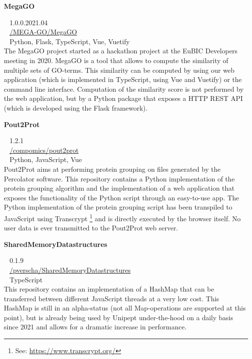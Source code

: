 \begin{large}\textbf{\textsf{MegaGO}}\end{large} \hfill \faTag ~ \textsf{1.0.0.2021.04} \\
\faGithub ~ \href{https://github.com/MEGA-GO/MegaGO}{\textsf{/MEGA-GO/MegaGO}} \\
\faCode ~ \textsf{Python, Flask, TypeScript, Vue, Vuetify} \\
The MegaGO project started as a hackathon project at the EuBIC Developers meeting in 2020.
MegaGO is a tool that allows to compute the similarity of multiple sets of GO-terms.
This similarity can be computed by using our web application (which is implemented in TypeScript, using Vue and Vuetify) or the command line interface.
Computation of the similarity score is not performed by the web application, but by a Python package that exposes a HTTP REST API (which is developed using the Flask framework).

\begin{large}\textbf{\textsf{Pout2Prot}}\end{large} \hfill \faTag ~ \textsf{1.2.1} \\
\faGithub ~ \href{https://github.com/compomics/pout2prot}{\textsf{/compomics/pout2prot}} \\
\faCode ~ \textsf{Python, JavaScript, Vue} \\
Pout2Prot aims at performing protein grouping on files generated by the Percolator software.
This repository contains a Python implementation of the protein grouping algorithm and the implementation of a web application that exposes the functionality of the Python script through an easy-to-use app.
The Python implementation of the protein grouping script has been transpiled to JavaScript using Transcrypt \footnote{See: \href{https://www.transcrypt.org/}{https://www.transcrypt.org/}} and is directly executed by the browser itself.
No user data is ever transmitted to the Pout2Prot web server.

\begin{large}\textbf{\textsf{SharedMemoryDatastructures}}\end{large} \hfill \faTag ~ \textsf{0.1.9} \\
\faGithub ~ \href{https://github.com/pverscha/SharedMemoryDatastructures}{\textsf{/pverscha/SharedMemoryDatastructures}} \\
\faCode ~ \textsf{TypeScript} \\
This repository contains an implementation of a HashMap that can be transferred between different JavaScript threads at a very low cost.
This HashMap is still in an alpha-status (not all Map-operations are supported at this point), but is already being used by Unipept under-the-hood on a daily basis since 2021 and allows for a dramatic increase in performance.

\newpage
